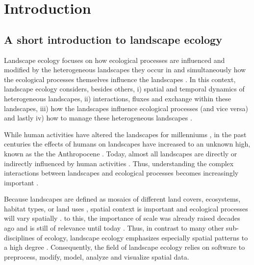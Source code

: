 \documentclass[smallextended]{svjour3}       %
\begin{document}
\def\spacingset#1{\renewcommand{\baselinestretch}%
{#1}\small\normalsize} \spacingset{1}


\hypertarget{sec:intro}{%
\section{Introduction}\label{sec:intro}}

\hypertarget{sec:landscape_ecology}{%
\subsection{A short introduction to landscape ecology}\label{sec:landscape_ecology}}

Landscape ecology focuses on how ecological processes are influenced and modified by the heterogeneous landscapes they occur in and simultaneously how the ecological processes themselves influence the landscapes \cite{Turner1989,Turner2005,With2019}.
In this context, landscape ecology considers, besides others, i) spatial and temporal dynamics of heterogeneous landscapes, ii) interactions, fluxes and exchange within these landscapes, iii) how the landscapes influence ecological processes (and vice versa) and lastly iv) how to manage these heterogeneous landscapes \cite{Risser1984,Turner1989}.

While human activities have altered the landscapes for millenniums \cite{Ellis2011,Ellis2015}, in the past centuries the effects of humans on landscapes have increased to an unknown high, known as the the Anthropocene \cite{Crutzen2002}.
Today, almost all landscapes are directly or indirectly influenced by human activities \cite{Vitousek1997}.
Thus, understanding the complex interactions between landscapes and ecological processes becomes increasingly important \cite{With2019}.

Because landscapes are defined as mosaics of different land covers, ecosystems, habitat types, or land uses \cite{Forman1986,Forman1995,Wiens1995}, spatial context is important and ecological processes will vary spatially \cite{With2019}.
to this, the importance of scale was already raised decades ago \cite{Wiens1989,Levin1992,Jelinski1996} and is still of relevance until today \cite{Simova2012,Estes2018}.
Thus, in contrast to many other sub-disciplines of ecology, landscape ecology emphasizes especially spatial patterns to a high degree \cite{Risser1984}.
Consequently, the field of landscape ecology relies on software to preprocess, modify, model, analyze and visualize spatial data.
\end{document}
